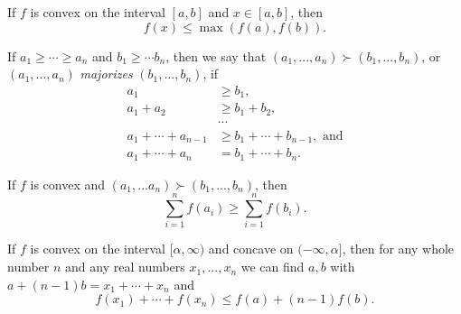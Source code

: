 \begin{prop} If $f$ is convex on the interval $[a,b]$ and $x \in [a,b]$, then
\[
f(x) \le \max(f(a),f(b)).
\]
\end{prop}

\begin{defn} If $a_1 \ge \cdots \ge a_n$ and $b_1 \ge \cdots b_n$, then we say that $(a_1, ..., a_n) \succ (b_1, ..., b_n)$, or $(a_1, ..., a_n)$ \emph{majorizes} $(b_1, ..., b_n)$, if
\begin{align*}
a_1 &\ge b_1,\\
a_1 + a_2 &\ge b_1+b_2,\\
&\cdots\\
a_1 + \cdots + a_{n-1} &\ge b_1 + \cdots + b_{n-1}, \mbox{ and}\\
a_1 + \cdots + a_n &= b_1 + \cdots + b_n.
\end{align*}
\end{defn}

\begin{thm}[Karamata] If $f$ is convex and $(a_1, ... a_n) \succ (b_1, ..., b_n)$, then
\[
\sum_{i=1}^n f(a_i) \ge \sum_{i=1}^n f(b_i).
\]
\end{thm}

\begin{thm}\label{n-1} If $f$ is convex on the interval $[\alpha,\infty)$ and concave on $(-\infty,\alpha]$, then for any whole number $n$ and any real numbers $x_1, ..., x_n$ we can find $a,b$ with $a+(n-1)b = x_1 + \cdots + x_n$ and
\[
f(x_1) + \cdots + f(x_n) \le f(a) + (n-1)f(b).
\]
\end{thm}

